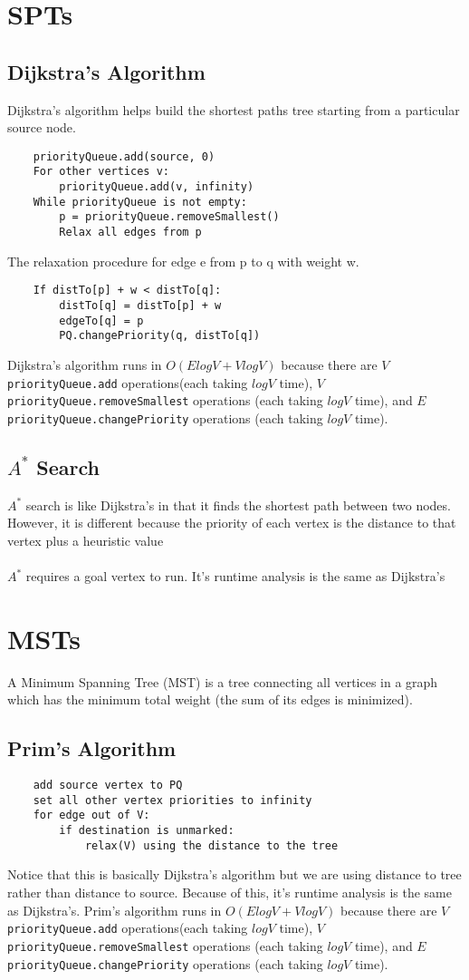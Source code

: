 \documentclass{article}
\begin{document}
\section{SPTs}
\subsection{Dijkstra's Algorithm}
Dijkstra's algorithm helps build the shortest paths tree starting from a particular source node.
\begin{lstlisting}
    priorityQueue.add(source, 0)
    For other vertices v:
        priorityQueue.add(v, infinity)
    While priorityQueue is not empty:
        p = priorityQueue.removeSmallest()
        Relax all edges from p
\end{lstlisting}
The relaxation procedure for edge e from p to q with weight w.
\begin{lstlisting}
    If distTo[p] + w < distTo[q]:
        distTo[q] = distTo[p] + w
        edgeTo[q] = p
        PQ.changePriority(q, distTo[q])
\end{lstlisting}
Dijkstra's algorithm runs in $O(ElogV + VlogV)$ because there are $V$ \lstinline{priorityQueue.add} operations(each taking $logV$ time),
$V$ \lstinline{priorityQueue.removeSmallest} operations (each taking $logV$ time), and
$E$ \lstinline{priorityQueue.changePriority} operations (each taking $logV$ time).
\subsection{$A^*$ Search}
$A^*$ search is like Dijkstra's in that it finds the shortest path between two nodes.
However, it is different because the priority of each vertex is the distance to that vertex plus a heuristic value
\\\\
$A^*$ requires a goal vertex to run. It's runtime analysis is the same as Dijkstra's
\section{MSTs}
A Minimum Spanning Tree (MST) is a tree connecting all vertices in a graph which has the minimum total weight (the sum of its edges is minimized).
\subsection{Prim's Algorithm}
\begin{lstlisting}
    add source vertex to PQ
    set all other vertex priorities to infinity
    for edge out of V:
        if destination is unmarked:
            relax(V) using the distance to the tree
\end{lstlisting}
Notice that this is basically Dijkstra's algorithm but we are using distance to tree rather than distance to source.
Because of this, it's runtime analysis is the same as Dijkstra's.
Prim's algorithm runs in $O(ElogV + VlogV)$ because there are $V$ \lstinline{priorityQueue.add} operations(each taking $logV$ time),
$V$ \lstinline{priorityQueue.removeSmallest} operations (each taking $logV$ time), and
$E$ \\ \lstinline{priorityQueue.changePriority} operations (each taking $logV$ time).
\end{document}
